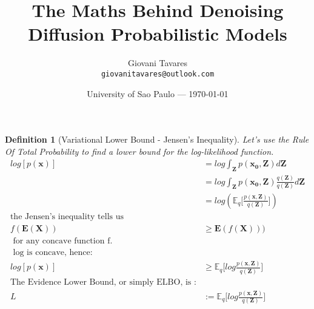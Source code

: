 \documentclass{article}
\title{The Maths Behind Denoising Diffusion Probabilistic Models} %
\author{Giovani Tavares\\ \texttt{giovanitavares@outlook.com}} %
\date{University of Sao Paulo --- \today} %
\newtheorem{definition}{Definition}[section]
\begin{document}
\maketitle %


 

\begin{definition}[Variational Lower Bound - Jensen's Inequality]
	Let's use the Rule Of Total Probability to find a lower bound for the log-likelihood function.
	\label{def:var_low_bound_jensen}
	\begin{align}
		log [p(\mathbf{x})] &=  log \int_\mathbf{Z} p(\mathbf{x_0}, \mathbf{Z} )d\mathbf{Z} \\
		&=  log \int_\mathbf{Z} p(\mathbf{x_0}, \mathbf{Z} ) \frac{q(\mathbf{Z})}{q(\mathbf{Z})}d\mathbf{Z} 	\\
	    &= log (\mathbb{E}_q\bigg[\frac{p(\mathbf{x, Z})} {q(\mathbf{Z})}\bigg]) \\
		\text{the Jensen's inequality tells us}& \\
		f(\mathbf{E}(\mathbf{X})) &\geq \mathbf{E}(f(\mathbf{X})))\\
		\text{   for any concave function f.} &\\
		\text{ log is concave, hence:} &  \\
		log [p(\mathbf{x})] &\geq \mathbb{E}_q\bigg[log \frac{p(\mathbf{x, Z})} {q(\mathbf{Z})}\bigg] \\
		\text{The Evidence Lower Bound, or simply ELBO, is :}  &\\
		L &:=   \mathbb{E}_q\bigg[log \frac{p(\mathbf{x, Z})} {q(\mathbf{Z})}\bigg] \\
	\end{align}
\end{definition}
\end{document}
